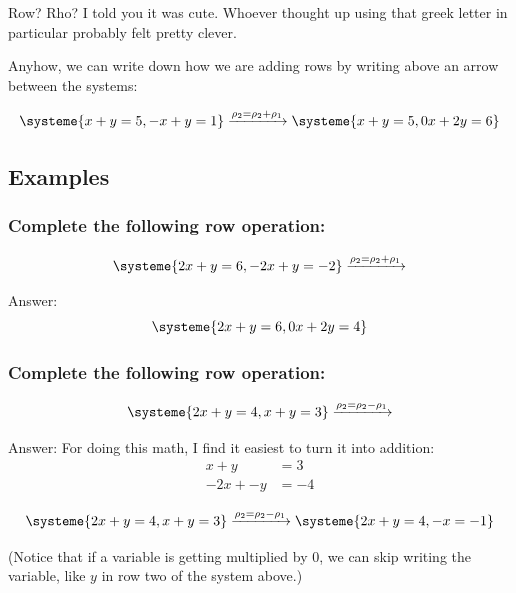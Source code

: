 \documentclass[a4paper,twoside,12pt]{memoir}  %
\begin{document}
Row? Rho? I told you it was cute. Whoever thought up using that greek letter in particular probably felt pretty clever.

Anyhow, we can write down how we are adding rows by writing above an arrow between the systems:

\begin{equation*}
  \systeme{
     x + y = 5,
    -x + y = 1
  }
  \xrightarrow{\rho_2 = \rho_2 + \rho_1}
  \systeme{
     x +  y = 5,
    0x + 2y = 6
  }
\end{equation*}

\subsection{Examples}
\subsubsection{Complete the following row operation:}
\begin{equation*}
  \systeme{
     2x + y = 6,
    -2x + y = -2
  }
  \xrightarrow{\rho_2 = \rho_2 + \rho_1}
\end{equation*}

Answer:
\begin{equation*}
  \systeme{
    2x +  y = 6,
    0x + 2y = 4
  }
\end{equation*}

\subsubsection{Complete the following row operation:}
\begin{equation*}
  \systeme{
     2x + y = 4,
      x + y = 3
  }
  \xrightarrow{\rho_2 = \rho_2 - \rho_1}
\end{equation*}

Answer:
For doing this math, I find it easiest to turn it into addition:
\begin{align*}
  x  +  y &=  3 \\
  -2x + -y &= -4
\end{align*}

\begin{equation*}
  \systeme{
     2x + y = 4,
      x + y = 3
  }
  \xrightarrow{\rho_2 = \rho_2 - \rho_1}
  \systeme{
     2x + y = 4,
     -x     = -1
  }
\end{equation*}

(Notice that if a variable is getting multiplied by 0, we can skip writing the variable, like $y$ in row two of the system above.)
\end{document}
